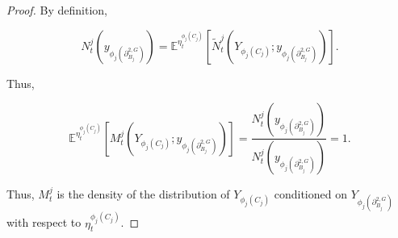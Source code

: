 \documentclass[12pt]{article}
\newcommand{\mb}{\mathbb}
\newcommand{\exmu}[2]{\mb{E}^{#1}\left[#2\right]}	%
\newcommand{\dgneigh}[2]{\partial^{2,#1}_{#2}}		%
\newcommand{\vind}[1]{_{#1}}						%
\newcommand{\vpara}[1]{^{#1}}						%
\newcommand{\tpara}[1]{_{#1}}						%
\newcommand{\Xg}{Y}									%
\newcommand{\alt}[1]{\tilde{#1}}					%
\newcommand{\mmm}{\eta}								%
\newcommand{\densen}{N}								%
\newcommand{\denseph}{\alt{N}}						%
\newcommand{\mdense}{M}								%
\newcommand{\xg}{y}									%
\newcommand{\jpara}[1]{^{#1}}						%
\begin{document}
\begin{proof}
By definition, 

\[\densen\jpara{j}\tpara{t}(\xg\vind{\phi_j(\dgneigh{G}{B_j})}) = \exmu{\mmm\vpara{\phi_j(C_j)}\tpara{t}}{\denseph\jpara{j}\tpara{t}(\Xg\vind{\phi_j(C_j)};\xg\vind{\phi_j(\dgneigh{G}{B_j})})}.\]

Thus,

\[\exmu{\mmm\vpara{\phi_j(C_j)}\tpara{t}}{\mdense\jpara{j}\tpara{t}(\Xg\vind{\phi_j(C_j)};\xg\vind{\phi_j(\dgneigh{G}{B_j})})} = \frac{\densen\jpara{j}\tpara{t}(\xg\vind{\phi_j(\dgneigh{G}{B_j})})}{\densen\jpara{j}\tpara{t}(\xg\vind{\phi_j(\dgneigh{G}{B_j})})} = 1.\]

Thus, \(\mdense\jpara{j}\tpara{t}\) is the density of the distribution of \(\Xg\vind{\phi_j(C_j)}\) conditioned on \(\Xg\vind{\phi_j(\dgneigh{G}{B_j})}\) with respect to \(\mmm\vpara{\phi_j(C_j)}\tpara{t}\).

\end{proof}

\newpage


\end{document}
